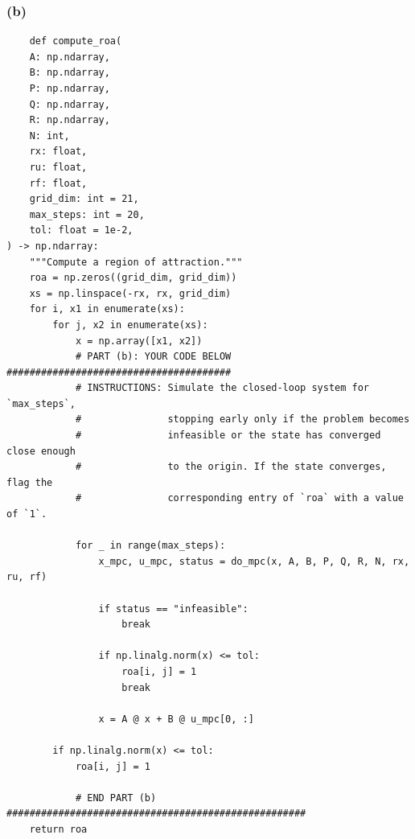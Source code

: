 \subsubsection*{(b)}
\begin{lstlisting}
    def compute_roa(
    A: np.ndarray,
    B: np.ndarray,
    P: np.ndarray,
    Q: np.ndarray,
    R: np.ndarray,
    N: int,
    rx: float,
    ru: float,
    rf: float,
    grid_dim: int = 21,
    max_steps: int = 20,
    tol: float = 1e-2,
) -> np.ndarray:
    """Compute a region of attraction."""
    roa = np.zeros((grid_dim, grid_dim))
    xs = np.linspace(-rx, rx, grid_dim)
    for i, x1 in enumerate(xs):
        for j, x2 in enumerate(xs):
            x = np.array([x1, x2])
            # PART (b): YOUR CODE BELOW #######################################
            # INSTRUCTIONS: Simulate the closed-loop system for `max_steps`,
            #               stopping early only if the problem becomes
            #               infeasible or the state has converged close enough
            #               to the origin. If the state converges, flag the
            #               corresponding entry of `roa` with a value of `1`.

            for _ in range(max_steps):
                x_mpc, u_mpc, status = do_mpc(x, A, B, P, Q, R, N, rx, ru, rf)

                if status == "infeasible":
                    break

                if np.linalg.norm(x) <= tol:
                    roa[i, j] = 1
                    break

                x = A @ x + B @ u_mpc[0, :]

        if np.linalg.norm(x) <= tol:
            roa[i, j] = 1

            # END PART (b) ####################################################
    return roa
\end{lstlisting}
